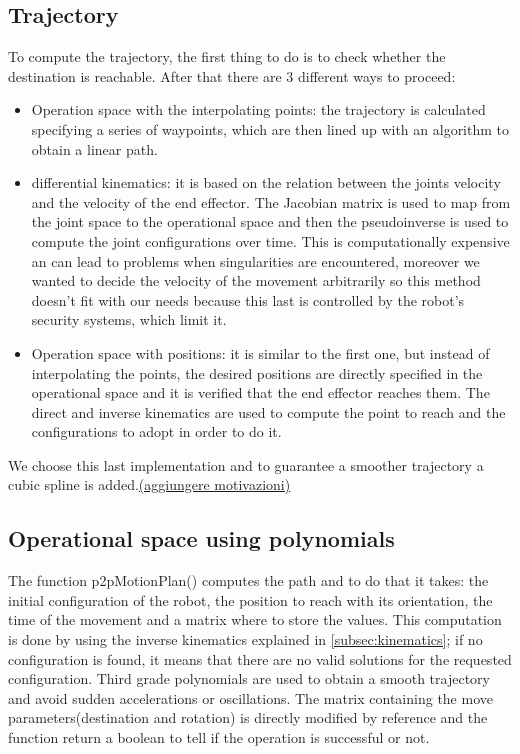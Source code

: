 \documentclass[12pt,a4paper]{article}
\begin{document}
\subsection{Trajectory}\label{subsec:trajectory}
To compute the trajectory, the first thing to do is to check whether the destination is reachable. After that there are 3 different ways to proceed:
\begin{itemize}
    \item Operation space with the interpolating points: the trajectory is calculated specifying a series of waypoints, which are then lined up with an algorithm to obtain a linear path.
    \item differential kinematics: it is based on the relation between the joints velocity and the velocity of the end effector. The Jacobian matrix is used to map from the joint space to the operational space and then the pseudoinverse is used to compute the joint configurations over time. This is computationally expensive an can lead to problems when singularities are encountered, moreover we wanted to decide the velocity of the movement arbitrarily so this method doesn't fit with our needs because this last is controlled by the robot's security systems, which limit it.
    \item Operation space with positions: it is similar to the first one, but instead of interpolating the points, the desired positions are directly specified in the operational space and it is verified that the end effector reaches them. The direct and inverse kinematics are used to compute the point to reach and the configurations to adopt in order to do it. 
\end{itemize}    
We choose this last implementation and to guarantee a smoother trajectory a cubic spline is added.\uline{(aggiungere motivazioni)}

\subsection{Operational space using polynomials}\label{subsec:opspace}
The function p2pMotionPlan() computes the path and to do that it takes: the initial configuration of the robot, the position to reach with its orientation, the time of the movement and a matrix where to store the values. This computation is done by using the inverse kinematics explained in \ref{subsec:kinematics}; if no configuration is found, it means that there are no valid solutions for the requested configuration. Third grade polynomials are used to obtain a smooth trajectory and avoid sudden accelerations or oscillations. The matrix containing the move parameters(destination and rotation) is directly modified by reference and the function return a boolean to tell if the operation is successful or not.
\end{document}
